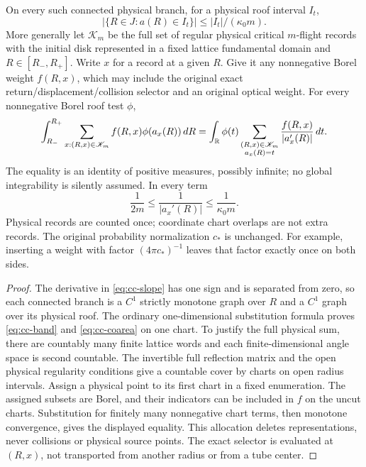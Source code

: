 \begin{corollary}
\label{cor:cc-coarea}
On every such connected physical branch, for a physical roof interval
$I_t$,
\begin{equation}\label{eq:cc-band}
 |\{R\in J:a(R)\in I_t\}|
       \leq |I_t|/(\kappa_0m).
\end{equation}
More generally let $\mathscr K_m$ be the full set of regular physical
critical $m$-flight records with the initial disk represented in a
fixed lattice fundamental domain and $R\in[R_-,R_+]$.  Write $x$ for
a record at a given $R$.  Give it any nonnegative Borel weight $f(R,x)$,
which may include the original exact return/displacement/collision
selector and an original optical weight.  For every nonnegative Borel
roof test $\phi$,
\begin{equation}\label{eq:cc-coarea}
 \int_{R_-}^{R_+}\sum_{x:(R,x)\in\mathscr K_m}
       f(R,x)\phi(a_x(R))\,dR
 =\int_{\mathbb R}\phi(t)
       \sum_{\substack{(R,x)\in\mathscr K_m\\a_x(R)=t}}
       \frac{f(R,x)}{|a_x'(R)|}\,dt .
\end{equation}
The equality is an identity of positive measures, possibly infinite;
no global integrability is silently assumed.  In every term
\[
 \frac1{2m}\leq\frac1{|a_x'(R)|}\leq\frac1{\kappa_0m}.
\]
Physical records are counted once; coordinate chart overlaps are not
extra records.  The original probability normalization $c_*$ is
unchanged.  For example, inserting a weight with factor
$(4\pi c_*)^{-1}$ leaves that factor exactly once on both sides.
\end{corollary}
\begin{proof}
The derivative in \eqref{eq:cc-slope} has one sign and is separated
from zero, so each connected branch is a $C^1$ strictly monotone
graph over $R$ and a $C^1$ graph over its physical roof.  The ordinary
one-dimensional substitution formula proves \eqref{eq:cc-band} and
\eqref{eq:cc-coarea} on one chart.  To justify the full physical sum,
there are countably many finite lattice words and each finite-dimensional
angle space is second countable.  The invertible full reflection
matrix and the open physical regularity conditions give a countable
cover by charts on open radius intervals.  Assign a physical point
to its first chart in a fixed enumeration.  The assigned subsets
are Borel, and their indicators can be included in $f$ on the
uncut charts.  Substitution for finitely many nonnegative chart terms,
then monotone convergence, gives the displayed equality.  This
allocation deletes representations, never collisions or physical
source points.  The exact selector is evaluated at $(R,x)$, not
transported from another radius or from a tube center.
\end{proof}

